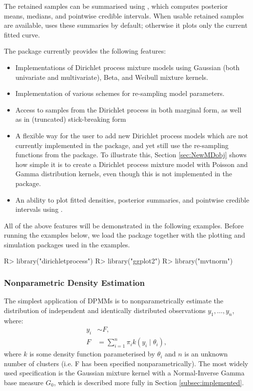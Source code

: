 \documentclass[nojss]{jss}
\begin{document}
The retained samples can be summarised using , which computes posterior means, medians, and pointwise credible intervals. When usable retained samples are available,  uses these summaries by default; otherwise it plots only the current fitted curve.

The  package currently provides the following features:

\begin{itemize}
\item Implementations of Dirichlet process mixture models using Gaussian (both univariate and multivariate), Beta, and Weibull mixture kernels.
\item Implementation of various schemes for re-sampling model parameters.
\item Access to samples from the Dirichlet process in both marginal form, as well as in (truncated) stick-breaking form
\item A flexible way for the user to add new Dirichlet process models which are not currently implemented in the package, and yet still use the re-sampling functions from the package. To illustrate this, Section \ref{sec:NewMDobj} shows how simple it is to create a Dirichlet process mixture model with Poisson and Gamma distribution kernels, even though this is not implemented in the package.
\item An ability to plot fitted densities, posterior summaries, and pointwise credible intervals using .
\end{itemize}

All of the above features will be demonstrated in the following examples. Before running the examples below, we load the  package together with the plotting and simulation packages used in the examples.

\begin{CodeInput}
R> library("dirichletprocess")
R> library("ggplot2")
R> library("mvtnorm")
\end{CodeInput}

\subsubsection{Nonparametric Density Estimation}
The simplest application of DPMMs is to  nonparametrically estimate the distribution of independent and identically distributed observations $y_1,\ldots,y_n$, where:
\begin{align*}
y_i & \sim F ,\\
F & = \sum _{i=1} ^n \pi _i k(y_i \mid \theta _i),
\end{align*}
where $k$ is some density function parameterised by $\theta _i$ and $n$ is an unknown number of clusters (i.e. F has been specified nonparametrically). The most widely used specification is the Gaussian mixture kernel with a Normal-Inverse Gamma base measure $G_0$, which is described more fully in Section \ref{subsec:implemented}.
\end{document}
